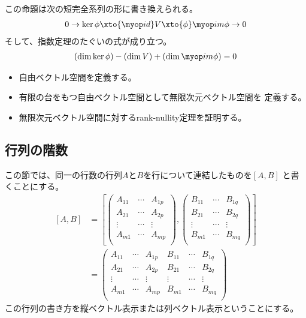 	この命題は次の短完全系列の形に書き換えられる。
	\begin{equation*}\begin{split} %
		0 \to \ker\phi \xto{\myid} V \xto{\phi} \im\phi \to 0
	\end{split}\end{equation*} %
	そして、指数定理のたぐいの式が成り立つ。
	\begin{equation*}\begin{split} %
		(\dim\ker\phi) - (\dim V) + (\dim\im\phi) = 0
	\end{split}\end{equation*} %

	\begin{todo}[ここまで]\label{todo:ここまで} %
		\begin{itemize}\setlength{\itemsep}{-1mm} %
			\item 自由ベクトル空間を定義する。
			\item 有限の台をもつ自由ベクトル空間として無限次元ベクトル空間を
			定義する。
			\item 無限次元ベクトル空間に対するrank-nullity定理を証明する。
		\end{itemize} %
	\end{todo} %

\subsection{行列の階数}\label{s2:行列の階数} %
	この節では、同一の行数の行列$A$と$B$を行について連結したものを$[A,B]$
	と書くことにする。
	\begin{equation*}\begin{split} %
		[A, B] &= \left[\begin{pmatrix}
			A_{11} & \cdots & A_{1p} \\
			A_{21} & \cdots & A_{2p} \\
			\vdots & \cdots & \vdots \\
			A_{m1} & \cdots & A_{mp} \\
		\end{pmatrix}, \begin{pmatrix}
			B_{11} & \cdots & B_{1q} \\
			B_{21} & \cdots & B_{2q} \\
			\vdots & \cdots & \vdots \\
			B_{m1} & \cdots & B_{mq} \\
		\end{pmatrix}\right] \\
		&= \begin{pmatrix}
			A_{11} & \cdots & A_{1p} & B_{11} & \cdots & B_{1q} \\
			A_{21} & \cdots & A_{2p} & B_{21} & \cdots & B_{2q} \\
			\vdots & \cdots & \vdots & \vdots & \cdots & \vdots \\
			A_{m1} & \cdots & A_{mp} & B_{m1} & \cdots & B_{mq} \\
		\end{pmatrix}
	\end{split}\end{equation*} %
	この行列の書き方を縦ベクトル表示または列ベクトル表示ということにする。

